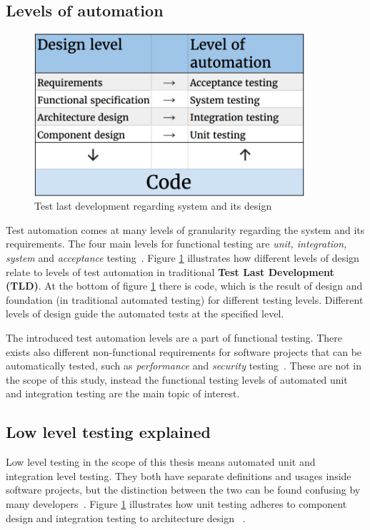     \subsection{Levels of automation}
    \begin{figure}[ht]
      \begin{center}
        \includegraphics[width=10cm]{images/testlevels.png}
        \caption{Test last development regarding system and its design}
        \label{fig:testlevels}
      \end{center}
    \end{figure}

    Test automation comes at many levels of granularity regarding the system and its requirements. The four main levels for
    functional testing are \textit{unit, integration, system} and \textit{acceptance} testing~\cite{itkonen2016}.
    Figure \ref{fig:testlevels} illustrates how different levels of design relate to levels of test automation in traditional
    \textbf{Test Last Development (TLD)}. At the bottom
    of figure \ref{fig:testlevels} there is code, which is the result of design and foundation (in traditional automated testing)
    for different testing levels. Different levels of design guide the automated tests at the specified level.

    The introduced test automation levels are a part of functional testing. There exists also different non-functional
    requirements for software projects that can be automatically tested, such as \textit{performance} and \textit{security} testing~\cite{crispin2009agile}.
    These are not in the scope of this study, instead the functional testing levels of automated unit and integration testing are
    the main topic of interest.

    \subsection{Low level testing explained}
    Low level testing in the scope of this thesis means automated unit and integration level testing. They both have separate
    definitions and usages inside software projects, but the distinction between the two can be found confusing by many developers~\cite{artofunit2013}.
    Figure \ref{fig:testlevels} illustrates how unit testing adheres to component design and integration testing to architecture design ~\cite{itkonen2016}.

